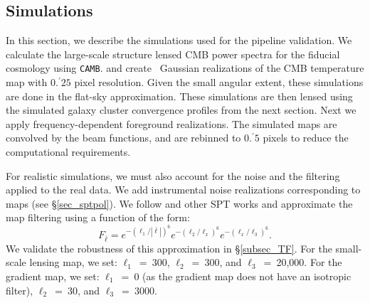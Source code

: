 \subsection{Simulations}
\label{sims_used}
In this section, we describe the simulations used for the pipeline validation. %
We calculate the large-scale structure lensed CMB power spectra for the fiducial \citet{planck15-13} cosmology using \texttt{CAMB}\citep{lewis00}.
and create \boxsize\ Gaussian realizations of the CMB temperature map with $0.^{\prime}25$ pixel resolution.%
 Given the small angular extent, these simulations are done in the flat-sky approximation. 
These simulations are then lensed using the simulated galaxy cluster convergence profiles from the next section. 
Next we apply frequency-dependent foreground 
realizations. %
The simulated maps are convolved by the beam functions, and are rebinned to $0.^{\prime}5$ pixels to reduce the computational requirements. 

For realistic simulations, we must also account for the noise and the filtering applied to the real data. 
We add instrumental noise realizations corresponding to \sptpol{} maps (see \S\ref{sec_sptpol}).
We follow \citet{baxter18} and other SPT works and approximate the map filtering using a function of the form:
\begin{equation}
F_{\bar{\ell}} = e^{-(\ell_{1}/|\bar{\ell}|)^{6}}  e^{-(\ell_{2}/\ell_{x})^{6}} e^{-(\ell_{x}/\ell_{3})^{6}}.
\label{eq_filter_TF}
\end{equation}
We validate the robustness of this approximation in \S\ref{subsec_TF}.
For the small-scale lensing map, we set: \mbox{$\ell_{1}$ = 300}, \mbox{$\ell_{2}$ = 300}, and \mbox{$\ell_{3}$ = 20,000}. 
For the gradient map, we set: \mbox{$\ell_{1}$ = 0} (as the gradient map does not have an isotropic filter), \mbox{$\ell_{2}$ = 30}, and \mbox{$\ell_{3}$ = 3000}.

